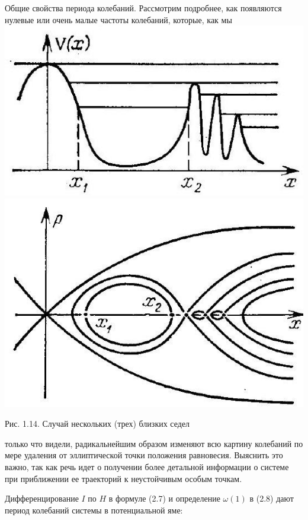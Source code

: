 \documentclass[10pt]{article}
\begin{document}
Общие свойства периода колебаний. Рассмотрим подробнее, как появляются нулевые или очень малые частоты колебаний, которые, как мы\\
\includegraphics[max width=\textwidth, center]{2024_12_13_2abbd56e24043f80c30dg-5(1)}\\
\includegraphics[max width=\textwidth, center]{2024_12_13_2abbd56e24043f80c30dg-5(2)}

Рис. 1.14. Случай нескольких (трех) близких седел

только что видели, радикальнейшим образом изменяют всю картину колебаний по мере удаления от эллиптической точки положения равновесия. Выяснить это важно, так как речь идет о получении более детальной информации о системе при приближении ее траекторий к неустойчивым особым точкам.

Дифференцирование $I$ по $H$ в формуле (2.7) и определение $\omega(1)$ в (2.8) дают период колебаний системы в потенциальной яме:
\end{document}
